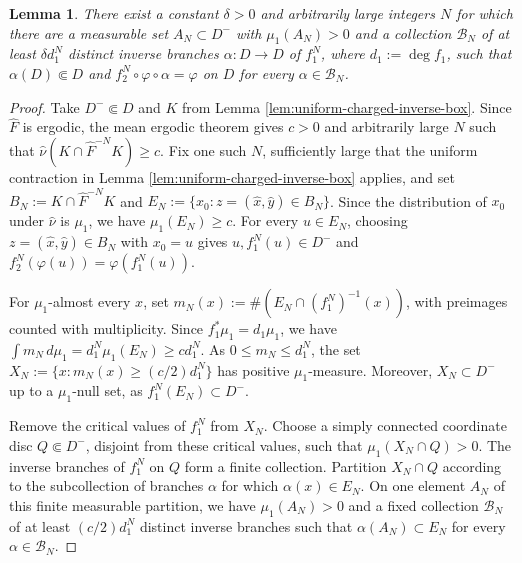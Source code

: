 \documentclass[11pt]{amsart}
\numberwithin{equation}{section}
\theoremstyle{plain}
\newtheorem{lem}[thm]{Lemma}
\theoremstyle{definition}
\theoremstyle{remark}
\begin{document}
\begin{lem}\label{lem:many-contracting-returns}
There exist a constant $\delta>0$ and arbitrarily large integers
$N$ for which there are a measurable set $A_N\subset D^-$ with
$\mu_1(A_N)>0$ and a collection $\mathscr B_N$ of at least
$\delta d_1^N$ distinct inverse branches
$\alpha\colon D\to D$ of $f_1^N$, where $d_1:=\deg f_1$, such that $\alpha(D)\Subset D$ and
$f_2^N\circ\varphi\circ\alpha=\varphi$ on $D$ for every
$\alpha\in\mathscr B_N$.
\end{lem}

\begin{proof}
Take $D^-\Subset D$ and $K$ from Lemma
\ref{lem:uniform-charged-inverse-box}. Since $\hat F$ is ergodic,
the mean ergodic theorem gives $c>0$ and arbitrarily large $N$ such
that $\hat\nu(K\cap\hat F^{-N}K)\geq c$.
Fix one such $N$, sufficiently large that the uniform contraction in
Lemma \ref{lem:uniform-charged-inverse-box} applies,
and set $B_N:=K\cap\hat F^{-N}K$ and
$E_N:=\{x_0:z=(\hat x,\hat y)\in B_N\}$.
Since the distribution of $x_0$ under $\hat\nu$ is $\mu_1$,
we have $\mu_1(E_N)\geq c$.
For every $u\in E_N$,
choosing $z=(\hat x,\hat y)\in B_N$ with $x_0=u$
gives
$u,f_1^N(u)\in D^-$ and
$f_2^N(\varphi(u))=\varphi(f_1^N(u))$.

For $\mu_1$-almost every $x$, set
$m_N(x):=\#(E_N\cap(f_1^N)^{-1}(x))$, with preimages counted with
multiplicity. Since $f_1^*\mu_1=d_1\mu_1$,
we have
$\int m_N\,d\mu_1=d_1^N\mu_1(E_N)\ge cd_1^N$. As
$0\le m_N\le d_1^N$, the set
$X_N:=\{x:m_N(x)\ge(c/2)d_1^N\}$ has positive
$\mu_1$-measure. Moreover, $X_N\subset D^-$ up to a
$\mu_1$-null set, as $f_1^N(E_N)\subset D^-$.

Remove the critical values of $f_1^N$ from $X_N$. Choose a simply
connected coordinate disc $Q\Subset D^-$, disjoint from these
critical values, such that $\mu_1(X_N\cap Q)>0$. The inverse branches
of $f_1^N$ on $Q$ form a finite collection. Partition $X_N\cap Q$
according to the subcollection of branches $\alpha$ for which
$\alpha(x)\in E_N$. On one element $A_N$ of this finite measurable
partition, we have $\mu_1(A_N)>0$ and a fixed collection
$\mathscr B_N$ of at least $(c/2)d_1^N$ distinct inverse branches
such that $\alpha(A_N)\subset E_N$ for every
$\alpha\in\mathscr B_N$.


\end{proof}
\end{document}
